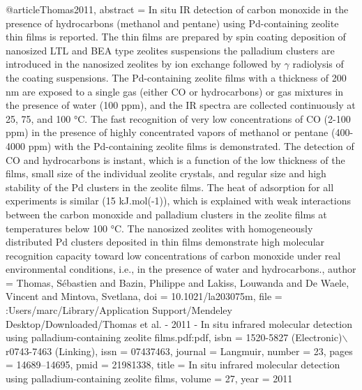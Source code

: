 @article{Thomas2011,
abstract = {In situ IR detection of carbon monoxide in the presence of hydrocarbons (methanol and pentane) using Pd-containing zeolite thin films is reported. The thin films are prepared by spin coating deposition of nanosized LTL and BEA type zeolites suspensions the palladium clusters are introduced in the nanosized zeolites by ion exchange followed by $\gamma$ radiolysis of the coating suspensions. The Pd-containing zeolite films with a thickness of 200 nm are exposed to a single gas (either CO or hydrocarbons) or gas mixtures in the presence of water (100 ppm), and the IR spectra are collected continuously at 25, 75, and 100 °C. The fast recognition of very low concentrations of CO (2-100 ppm) in the presence of highly concentrated vapors of methanol or pentane (400-4000 ppm) with the Pd-containing zeolite films is demonstrated. The detection of CO and hydrocarbons is instant, which is a function of the low thickness of the films, small size of the individual zeolite crystals, and regular size and high stability of the Pd clusters in the zeolite films. The heat of adsorption for all experiments is similar (15 kJ.mol(-1)), which is explained with weak interactions between the carbon monoxide and palladium clusters in the zeolite films at temperatures below 100 °C. The nanosized zeolites with homogeneously distributed Pd clusters deposited in thin films demonstrate high molecular recognition capacity toward low concentrations of carbon monoxide under real environmental conditions, i.e., in the presence of water and hydrocarbons.},
author = {Thomas, S{\'{e}}bastien and Bazin, Philippe and Lakiss, Louwanda and {De Waele}, Vincent and Mintova, Svetlana},
doi = {10.1021/la203075m},
file = {:Users/marc/Library/Application Support/Mendeley Desktop/Downloaded/Thomas et al. - 2011 - In situ infrared molecular detection using palladium-containing zeolite films.pdf:pdf},
isbn = {1520-5827 (Electronic)$\backslash$r0743-7463 (Linking)},
issn = {07437463},
journal = {Langmuir},
number = {23},
pages = {14689--14695},
pmid = {21981338},
title = {{In situ infrared molecular detection using palladium-containing zeolite films}},
volume = {27},
year = {2011}
}
